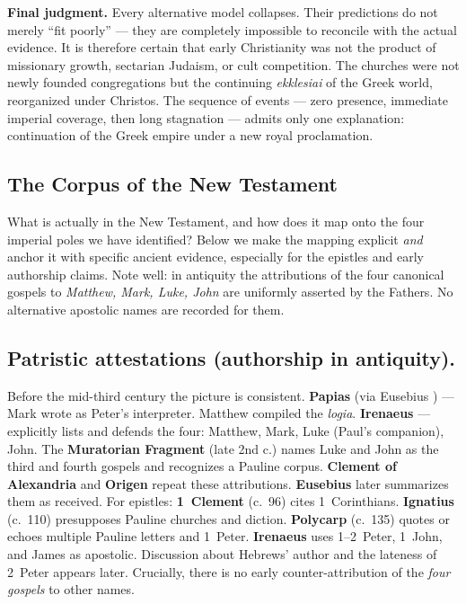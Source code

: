 \textbf{Final judgment.}
Every alternative model collapses.
Their predictions do not merely “fit poorly” --- they are completely impossible to reconcile with the actual evidence.
It is therefore certain that early Christianity was not the product of missionary growth, sectarian Judaism, or cult competition.
The churches were not newly founded congregations but the continuing \textit{ekklesiai} of the Greek world, reorganized under Christos.
The sequence of events --- zero presence, immediate imperial coverage, then long stagnation --- admits only one explanation: continuation of the Greek empire under a new royal proclamation.

\subsection{The Corpus of the New Testament}\label{subsec:the-corpus-of-the-new-testament}

What is actually in the New Testament, and how does it map onto the four imperial poles we have identified?
Below we make the mapping explicit \emph{and} anchor it with specific ancient evidence, especially for the epistles and early authorship claims.
Note well: in antiquity the attributions of the four canonical gospels to \textit{Matthew, Mark, Luke, John} are uniformly asserted by the Fathers.
No alternative apostolic names are recorded for them.

\subsection{Patristic attestations (authorship in antiquity).}
Before the mid-third century the picture is consistent.
\textbf{Papias} (via Eusebius \cite[3.39]{eusebius:he}) --- Mark wrote as Peter's interpreter.
Matthew compiled the \textit{logia}.
\textbf{Irenaeus} \cite[3.1.1]{irenaeus:advhaer} --- explicitly lists and defends the four: Matthew, Mark, Luke (Paul's companion), John.
The \textbf{Muratorian Fragment} (late 2nd c.) names Luke and John as the third and fourth gospels and recognizes a Pauline corpus.
\textbf{Clement of Alexandria} \cite{clement:stromata} and \textbf{Origen} \cite{origen:contracels} repeat these attributions.
\textbf{Eusebius} later summarizes them as received.
For epistles: \textbf{1~Clement} (c.~96) cites 1~Corinthians.
\textbf{Ignatius} (c.~110) presupposes Pauline churches and diction.
\textbf{Polycarp} (c.~135) quotes or echoes multiple Pauline letters and 1~Peter.
\textbf{Irenaeus} uses 1--2~Peter, 1~John, and James as apostolic.
Discussion about Hebrews’ author and the lateness of 2~Peter appears later.
Crucially, there is no early counter-attribution of the \emph{four gospels} to other names.

